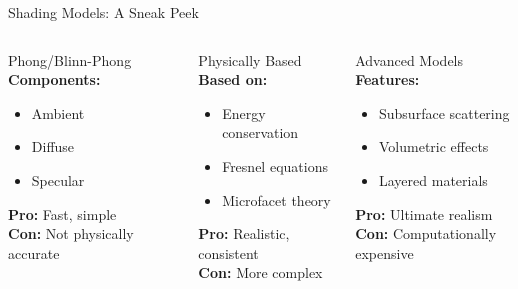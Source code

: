 \begin{frame}{Shading Models: A Sneak Peek}
    \begin{columns}
        \begin{column}{0.33\textwidth}
            \begin{conceptbox}{Phong/Blinn-Phong}
                \textbf{Components:}
                \begin{itemize}
                    \item Ambient
                    \item Diffuse  
                    \item Specular
                \end{itemize}
                \textbf{Pro:} Fast, simple\\
                \textbf{Con:} Not physically accurate
            \end{conceptbox}
        \end{column}
        \begin{column}{0.33\textwidth}
            \begin{conceptbox}{Physically Based}
                \textbf{Based on:}
                \begin{itemize}
                    \item Energy conservation
                    \item Fresnel equations
                    \item Microfacet theory
                \end{itemize}
                \textbf{Pro:} Realistic, consistent\\
                \textbf{Con:} More complex
            \end{conceptbox}
        \end{column}
        \begin{column}{0.33\textwidth}
            \begin{conceptbox}{Advanced Models}
                \textbf{Features:}
                \begin{itemize}
                    \item Subsurface scattering
                    \item Volumetric effects
                    \item Layered materials
                \end{itemize}
                \textbf{Pro:} Ultimate realism\\
                \textbf{Con:} Computationally expensive
            \end{conceptbox}
        \end{column}
    \end{columns}
\end{frame}

